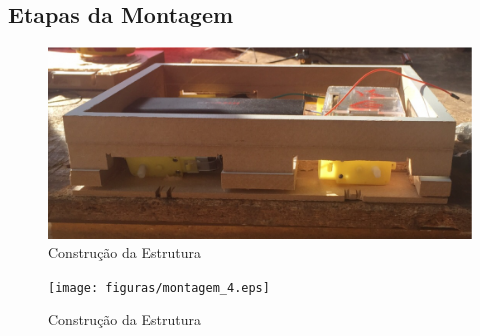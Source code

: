 \begin{apendicesenv}
\chapter{Etapas da Montagem}

\begin{figure}[H]
    \centering
    \includegraphics[width=1\textwidth]{figuras/montagem_3.eps}
    \caption{Construção da Estrutura}
    \label{fig:montagem_3}
\end{figure}

\begin{figure}[H]
    \centering
    \texttt{[image: figuras/montagem\_4.eps]}
    \caption{Construção da Estrutura}
    \label{fig:montagem_4}
\end{figure}


\end{apendicesenv}
